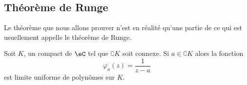\subsection{Théorème de Runge}

Le théorème que nous allons prouver n'est en réalité qu'une partie de ce qui est usuellement appelle le théorème de Runge.
\begin{theorem}     \label{ThoMvMCci}
    Soit \( K\), un compact de \( \eC\) tel que \( \complement K\) soit connexe. Si \( a\in \complement K\) alors la fonction 
    \begin{equation}
        \varphi_a(z)=\frac{1}{ z-a }
    \end{equation}
    est limite uniforme de polynômes sur \( K\).
\end{theorem}


